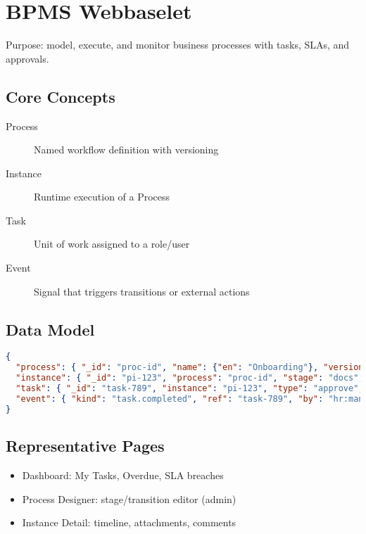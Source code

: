 \section{BPMS Webbaselet}
\label{sec:app-bpms}

Purpose: model, execute, and monitor business processes with tasks, SLAs, and approvals.

\subsection{Core Concepts}
\begin{description}
  \item[Process] Named workflow definition with versioning
  \item[Instance] Runtime execution of a Process
  \item[Task] Unit of work assigned to a role/user
  \item[Event] Signal that triggers transitions or external actions
\end{description}

\subsection{Data Model}
\begin{lstlisting}[language=JSON,caption={BPMS entities}]
{
  "process": { "_id": "proc-id", "name": {"en": "Onboarding"}, "version": 3, "stages": ["init","docs","it","done"] },
  "instance": { "_id": "pi-123", "process": "proc-id", "stage": "docs", "state": "active", "assignees": ["hr:manager"], "due": "2025-09-30" },
  "task": { "_id": "task-789", "instance": "pi-123", "type": "approve", "owner": "hr:manager", "status": "open", "slaHours": 48 },
  "event": { "kind": "task.completed", "ref": "task-789", "by": "hr:manager", "at": "2025-09-12T08:30:00Z" }
}
\end{lstlisting}

\subsection{Representative Pages}
\begin{itemize}
  \item Dashboard: My Tasks, Overdue, SLA breaches
  \item Process Designer: stage/transition editor (admin)
  \item Instance Detail: timeline, attachments, comments
\end{itemize}

